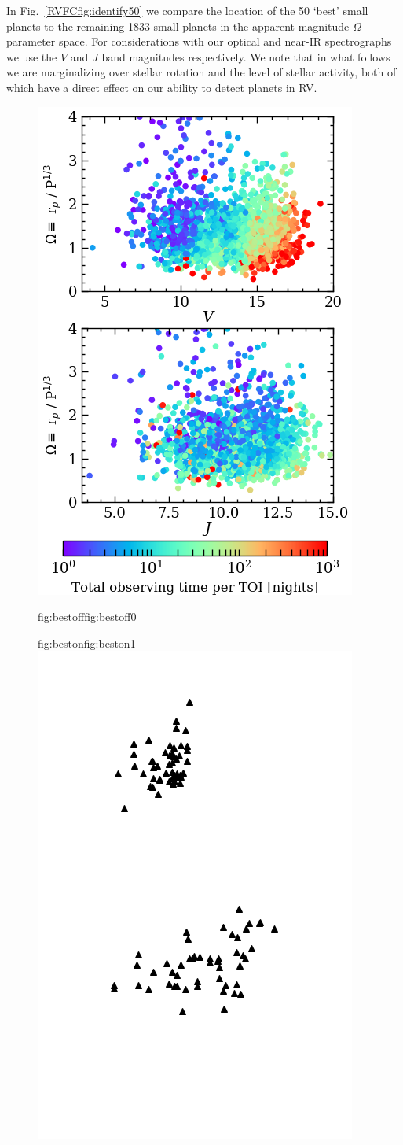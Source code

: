 In Fig.~\ref{RVFCfig:identify50} we compare the location of the 50 `best' small planets to the remaining
1833 small planets in the apparent magnitude-$\Omega$ parameter space. For considerations with our
optical and near-IR spectrographs we use the $V$ and $J$ band magnitudes respectively.
We note that in what follows we are marginalizing over stellar rotation and the level of stellar activity, both of
which have a direct effect on our ability to detect planets in RV.

\begin{figure}
  \centering
  \includegraphics[width=0.6\hsize]{figures/identify50_bkgd.png}%
  \hspace{-0.6\hsize}%
  \begin{ocg}{fig:bestoff}{fig:bestoff}{0}%
  \end{ocg}%
  \begin{ocg}{fig:beston}{fig:beston}{1}%
  \includegraphics[width=0.6\hsize]{figures/identify50_best.png}%

\end{ocg}
\end{figure}

